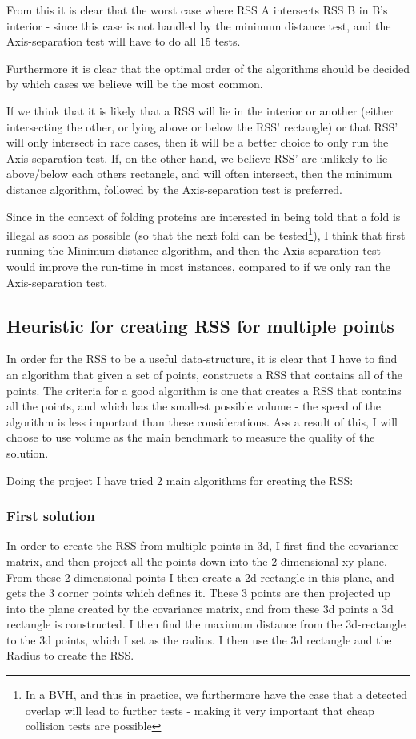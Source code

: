 From this it is clear that the worst case where RSS A intersects RSS B in B's interior - since this case is not handled by the minimum distance test, and the Axis-separation test will have to do all 15 tests.

Furthermore it is clear that the optimal order of the algorithms should be decided by which cases we believe will be the most common. 

If we think that it is likely that a RSS will lie in the interior or another (either intersecting the other, or lying above or below the RSS' rectangle) or that RSS' will only intersect in rare cases, then it will be a better choice to only run the Axis-separation test. If, on the other hand, we believe RSS' are unlikely to lie above/below each others rectangle, and will often intersect, then the minimum distance algorithm, followed by the Axis-separation test is preferred.

Since in the context of folding proteins are interested in being told that a fold is illegal as soon as possible (so that the next fold can be tested\footnote{In a BVH, and thus in practice, we furthermore have the case that a detected overlap will lead to further tests - making it very important that cheap collision tests are possible}), I think that first running the Minimum distance algorithm, and then the Axis-separation test would improve the run-time in most instances, compared to if we only ran the Axis-separation test.

\subsection{Heuristic for creating RSS for multiple points}
In order for the RSS to be a useful data-structure, it is clear that I have to find an algorithm that given a set of points, constructs a RSS that contains all of the points. The criteria for a good algorithm is one that creates a RSS that contains all the points, and which has the smallest possible volume - the speed of the algorithm is less important than these considerations. Ass a result of this, I will choose to use volume as the main benchmark to measure the quality of the solution.

Doing the project I have tried 2 main algorithms for creating the RSS:

\subsubsection{First solution}
In order to create the RSS from multiple points in 3d, I first find the covariance matrix, and then project all the points down into the 2 dimensional xy-plane. From these 2-dimensional points I then create a 2d rectangle in this plane, and gets the 3 corner points which defines it. These 3 points are then projected up into the plane created by the covariance matrix, and from these 3d points a 3d rectangle is constructed. I then find the maximum distance from the 3d-rectangle to the 3d points, which I set as the radius. I then use the 3d rectangle and the Radius to create the RSS.

